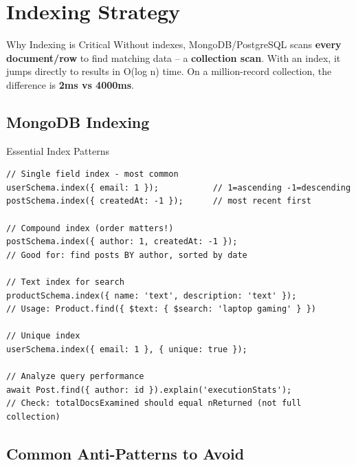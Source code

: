 \documentclass[12pt,a4paper]{article}
\begin{document}
\newpage

\section{Indexing Strategy}

\begin{infobox}{Why Indexing is Critical}
Without indexes, MongoDB/PostgreSQL scans \textbf{every document/row} to find matching data -- a \textbf{collection scan}. With an index, it jumps directly to results in O(log n) time. On a million-record collection, the difference is \textbf{2ms vs 4000ms}.
\end{infobox}

\subsection{MongoDB Indexing}
\begin{codebox}{Essential Index Patterns}
\begin{lstlisting}
// Single field index - most common
userSchema.index({ email: 1 });           // 1=ascending -1=descending
postSchema.index({ createdAt: -1 });      // most recent first

// Compound index (order matters!)
postSchema.index({ author: 1, createdAt: -1 });
// Good for: find posts BY author, sorted by date

// Text index for search
productSchema.index({ name: 'text', description: 'text' });
// Usage: Product.find({ $text: { $search: 'laptop gaming' } })

// Unique index
userSchema.index({ email: 1 }, { unique: true });

// Analyze query performance
await Post.find({ author: id }).explain('executionStats');
// Check: totalDocsExamined should equal nReturned (not full collection)
\end{lstlisting}
\end{codebox}

\subsection{Common Anti-Patterns to Avoid}
\end{document}
